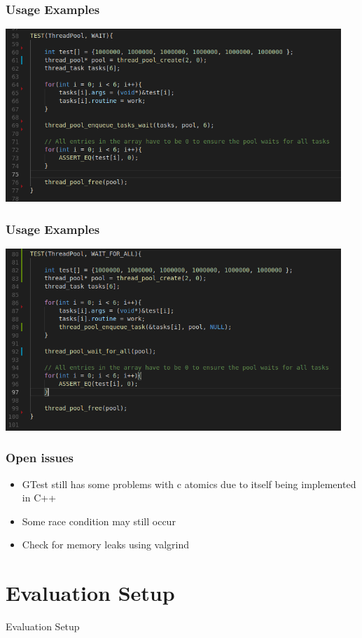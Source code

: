 \documentclass{beamer}
\begin{document}
\begin{frame}
	\frametitle{Usage Examples}
	\begin{center}
		\includegraphics[width=0.95\textwidth]{img/thread_pool_use.png}
	\end{center}
\end{frame}

\begin{frame}
\frametitle{Usage Examples}
\begin{center}
	\includegraphics[width=0.95\textwidth]{img/thread_pool_use2.png}
\end{center}
\end{frame}

\begin{frame}
	\frametitle{Open issues}
	\begin{itemize}
		\item GTest still has some problems with c atomics due to itself being implemented in C++
		\item Some race condition may still occur
		\item Check for memory leaks using valgrind
	\end{itemize}
\end{frame}

\section{Evaluation Setup}
\begin{frame}
	\begin{center}
		\huge Evaluation Setup
	\end{center}
\end{frame}
\end{document}
